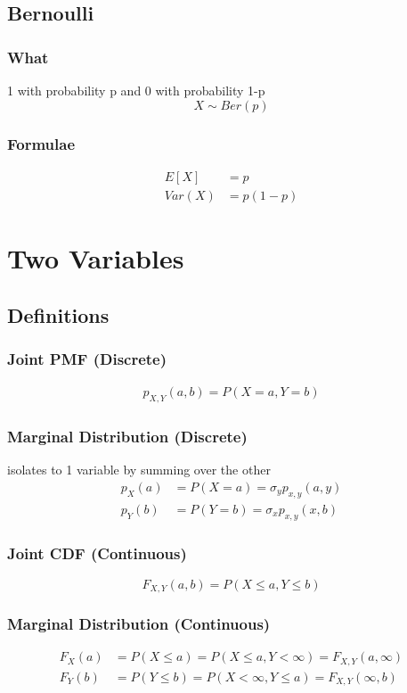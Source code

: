 \documentclass[12pt]{amsart}
\begin{document}
\subsection{Bernoulli}
\subsubsection{What}
1 with probability p and 0 with probability 1-p
\[
X \sim Ber(p)
\]
\subsubsection{Formulae}
\begin{align*}
E[X] &= p \\
Var(X) &= p(1-p)
\end{align*}

\section{Two Variables}
\subsection{Definitions}
\subsubsection{Joint PMF (Discrete)}
\begin{align*}
p_{X,Y}(a,b) = P(X = a, Y = b)
\end{align*}
\subsubsection{Marginal Distribution (Discrete)}
isolates to 1 variable by summing over the other
\begin{align*}
p_X(a) &= P(X = a) = \sigma_y p_{x,y}(a,y) \\
p_Y(b) &= P(Y = b) = \sigma_x p_{x,y}(x,b)
\end{align*}
\subsubsection{Joint CDF (Continuous)}
\[
F_{X,Y}(a,b) = P(X \leq a, Y \leq b)
\]
\subsubsection{Marginal Distribution (Continuous)}
\begin{align*}
F_X(a) &= P(X \leq a) = P(X \leq a, Y < \infty) = F_{X,Y}(a,\infty) \\
F_Y(b) &= P(Y \leq b) = P(X < \infty, Y \leq a) = F_{X,Y}(\infty, b)
\end{align*}
\end{document}
